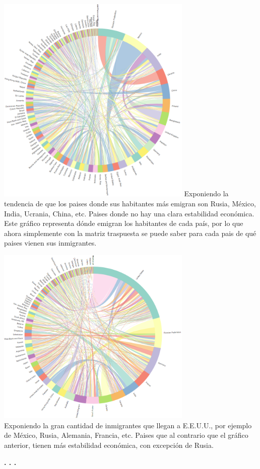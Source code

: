 \documentclass{article}\usepackage[]{graphicx}\usepackage[]{color}
\begin{document}
\vbox{
    \centering
    \includegraphics[width=0.7\textwidth]{imag/cuerdasmigra_inte}
}
Exponiendo la tendencia de que los paises donde sus habitantes m\'as emigran son Rusia, M\'exico, India, Ucrania, China, etc. Paises donde no hay una clara estabilidad econ\'omica.
\clearpage
Este gr\'afico representa d\'onde emigran los habitantes de cada pa\'is, por lo que ahora simplemente con la matriz traspuesta se puede saber para cada pais de qu\'e paises vienen sus inmigrantes.

\vbox{
    \centering
    \includegraphics[width=0.7\textwidth]{imag/cuerdasmigratra_inte}
}
~\\
Exponiendo la gran cantidad de inmigrantes que llegan a E.E.U.U., por ejemplo de M\'exico, Rusia, Alemania, Francia, etc. Paises que al contrario que el gr\'afico anterior, tienen m\'as estabilidad econ\'omica, con excepci\'on de Rusia.
\begin{center}
\textbf{. . .}
\end{center}
\end{document}
